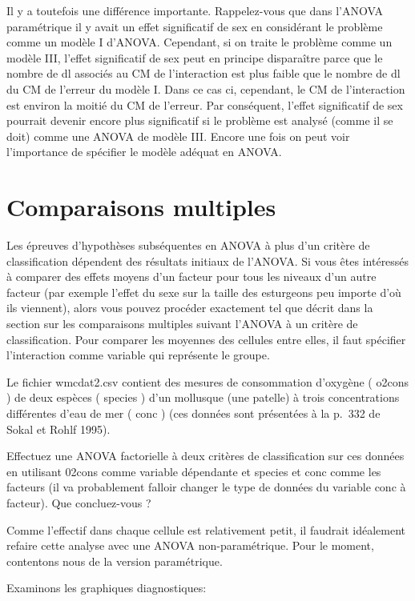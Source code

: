 \documentclass[12pt,]{book}
\begin{document}
Il y a toutefois une différence importante. Rappelez-vous que dans l'ANOVA paramétrique il y avait un effet significatif de sex en considérant le problème comme un modèle I d'ANOVA. Cependant, si on traite le problème comme un modèle III, l'effet significatif de sex peut en principe disparaître parce que le nombre de dl associés au CM de l'interaction est plus faible que le nombre de dl du CM de l'erreur du modèle I. Dans ce cas ci, cependant, le CM de l'interaction est environ la moitié du CM de l'erreur. Par conséquent, l'effet significatif de sex pourrait devenir encore plus significatif si le problème est analysé (comme il se doit) comme une ANOVA de modèle III. Encore une fois on peut voir l'importance de spécifier le modèle adéquat en ANOVA.

\hypertarget{comparaisons-multiples}{%
\section{Comparaisons multiples}\label{comparaisons-multiples}}

Les épreuves d'hypothèses subséquentes en ANOVA à plus d'un critère de classification dépendent des résultats initiaux de l'ANOVA. Si vous êtes intéressés à comparer des effets moyens d'un facteur pour tous les niveaux d'un autre facteur (par exemple l'effet du sexe sur la taille des esturgeons peu importe d'où ils viennent), alors vous pouvez procéder exactement tel que décrit dans la section sur les comparaisons multiples suivant l'ANOVA à un critère de classification. Pour comparer les moyennes des cellules entre elles, il faut spécifier l'interaction comme variable qui représente le groupe.

Le fichier wmcdat2.csv contient des mesures de consommation d'oxygène ( o2cons ) de deux espèces ( species ) d'un mollusque (une patelle) à trois concentrations différentes d'eau de mer ( conc ) (ces données sont présentées à la p.~332 de Sokal et Rohlf 1995).

Effectuez une ANOVA factorielle à deux critères de classification sur ces données en utilisant 02cons comme variable dépendante et species et conc comme les facteurs (il va probablement falloir changer le type de données du variable conc à facteur). Que concluez-vous ?

Comme l'effectif dans chaque cellule est relativement petit, il faudrait idéalement refaire cette analyse avec une ANOVA non-paramétrique. Pour le moment, contentons nous de la version paramétrique.

Examinons les graphiques diagnostiques:
\end{document}
